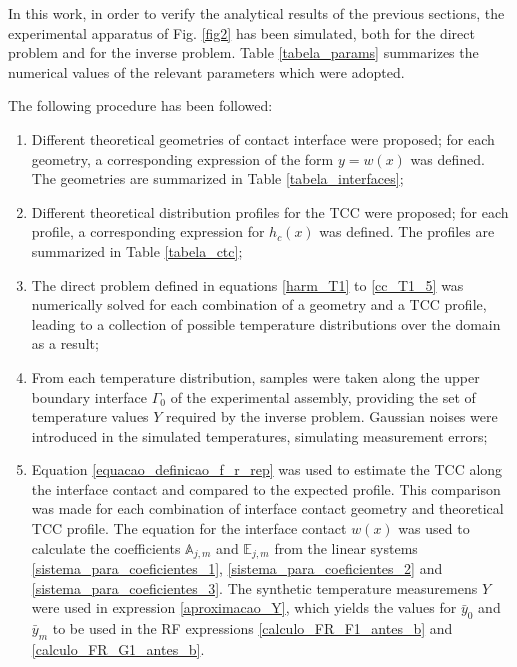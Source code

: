 \documentclass[conference,compsoc,fleqn]{IEEEtran}
\begin{document}

In this work, in order to verify the analytical results of the previous sections, the experimental apparatus of Fig. \ref{fig2} has been simulated, both for the direct problem and for the inverse problem. Table \ref{tabela_params} summarizes the numerical values of the relevant parameters which were adopted. 

The following procedure has been followed:
\begin{enumerate}
	\item Different theoretical geometries of contact interface were proposed; for each geometry, a corresponding expression of the form $y = w(x)$ was defined. The geometries are summarized in Table \ref{tabela_interfaces};
	\item Different theoretical distribution profiles for the TCC were proposed; for each profile, a corresponding expression for $h_c(x)$ was defined. The profiles are summarized in Table \ref{tabela_ctc};
	\item The direct problem defined in equations \eqref{harm_T1} to \eqref{cc_T1_5} was numerically solved for each combination of a geometry and a TCC profile, leading to a collection of possible temperature distributions over the domain as a result;
	\item From each temperature distribution, samples were taken along the upper boundary interface $\Gamma_0$ of the experimental assembly, providing the set of temperature values $Y$ required by the inverse problem. Gaussian noises were introduced in the simulated temperatures, simulating measurement errors;
	\item Equation \eqref{equacao_definicao_f_r_rep} was used to estimate the TCC along the interface contact and compared to the expected profile. This comparison was made for each combination of interface contact geometry and theoretical TCC profile. The equation for the interface contact $w(x)$ was used to calculate the coefficients $\mathbb{A}_{j,m}$ and $\mathbb{E}_{j,m}$ from the linear systems \eqref{sistema_para_coeficientes_1}, \eqref{sistema_para_coeficientes_2} and \eqref{sistema_para_coeficientes_3}. The synthetic temperature measuremens $Y$ were used in expression \eqref{aproximacao_Y}, which yields the values for $\bar{y}_0$ and $\bar{y}_m$ to be used in the RF expressions \eqref{calculo_FR_F1_antes_b} and \eqref{calculo_FR_G1_antes_b}.
\end{enumerate}
\end{document}
